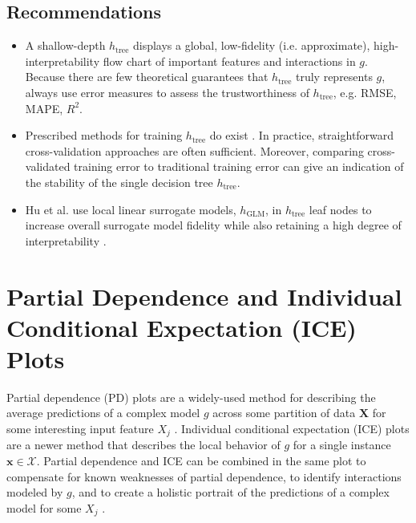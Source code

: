 \documentclass[sigconf, review]{acmart}
\begin{document}
\subsection{Recommendations}

\begin{itemize}
	
	\item A shallow-depth $h_{\text{tree}}$ displays a global, low-fidelity (i.e. approximate), high-interpretability flow chart of important features and interactions in $g$. Because there are few theoretical guarantees that $h_{\text{tree}}$ truly represents $g$, always use error measures to assess the trustworthiness of $h_{\text{tree}}$, e.g. RMSE, MAPE, $R^2$.
	
	\item Prescribed methods for training $h_{\text{tree}}$ do exist \cite{dt_surrogate1} \cite{dt_surrogate2}. In practice, straightforward cross-validation approaches are often sufficient. Moreover, comparing cross-validated training error to traditional training error can give an indication of the stability of the single decision tree $h_{\text{tree}}$.
	
	\item Hu et al. use local linear surrogate models, $h_{\text{GLM}}$, in $h_{\text{tree}}$ leaf nodes to increase overall surrogate model fidelity while also retaining a high degree of interpretability \cite{lime-sup}.
	
\end{itemize}

\section{Partial Dependence and Individual Conditional Expectation (ICE) Plots}
\label{sec:pd_ice}

Partial dependence (PD) plots are a widely-used method for describing the average predictions of a complex model $g$ across some partition of data $\mathbf{X}$ for some interesting input feature $X_j$ \cite{esl}. Individual conditional expectation (ICE) plots are a newer method that describes the local behavior of $g$ for a single instance $\mathbf{x} \in \mathcal{X}$. Partial dependence and ICE can be combined in the same plot to compensate for known weaknesses of partial dependence, to identify interactions modeled by $g$, and to create a holistic portrait of the predictions of a complex model for some $X_j$  \cite{ice_plots}.
\end{document}
